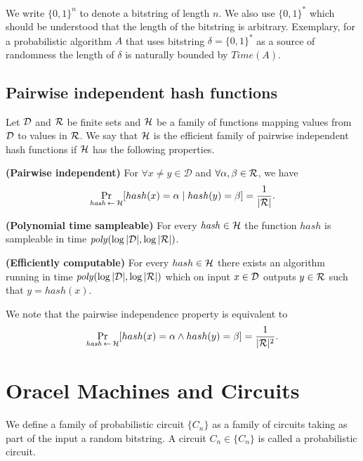 We write $\{0,1\}^{n}$ to denote a bitstring of length $n$.
We also use $\{0,1\}^{*}$ which should be understood that the length of the bitstring is arbitrary.
Exemplary, for a probabilistic algorithm $A$ that uses bitstring $\delta = \{0,1\}^{*}$ as a source of randomness
the length of $\delta$ is naturally bounded by $\mathit{Time}(A)$.

\subsection{Pairwise independent hash functions}
\begin{definition}
Let $\mathcal{D}$ and $\mathcal{R}$ be finite sets and $\mathcal{H}$ be a family of functions mapping values from $\mathcal{D}$ to values in $\mathcal{R}$.
We say that $\mathcal{H}$ is \textnormal{the efficient family of pairwise independent hash functions}
if $\mathcal{H}$ has the following properties.

\textbf{(Pairwise independent)} For $\forall x \neq y \in \mathcal{D}$ and $\forall \alpha, \beta \in \mathcal{R}$, we have
\begin{displaymath}
\underset{\hash \la0 \cH}{\Pr}[hash(x) = \alpha \mid hash(y) = \beta] = \frac{1}{|\cR|}.
\end{displaymath}

\textbf{(Polynomial time sampleable)} For every $\mathit{hash} \in \mathcal{H}$ the function $\mathit{hash}$ is sampleable in time $\mathit{poly}(\log|\mathcal{D}|, \log|\mathcal{R}|)$.

\textbf{(Efficiently computable)}
For every $hash \in \mathcal{H}$ there exists an algorithm running in time $\mathit{poly}(\log|\mathcal{D}|, \log|\mathcal{R}|)$ which
on input $x \in \mathcal{D}$ outputs $y \in \mathcal{R}$ such that $y = hash(x)$.
\end{definition}

We note that the pairwise independence property is equivalent to
\begin{displaymath}
\underset{\hash \la0 \cH}{\Pr}[hash(x) = \alpha \land hash(y) = \beta] = \frac{1}{|\cR|^2}.
\end{displaymath}

\section{Oracel Machines and Circuits}

We define a family of probabilistic circuit $\{C_n\}$ as a family of circuits taking as part of the input a random bitstring.
A circuit $C_n \in \{C_n\}$ is called a probabilistic circuit.

